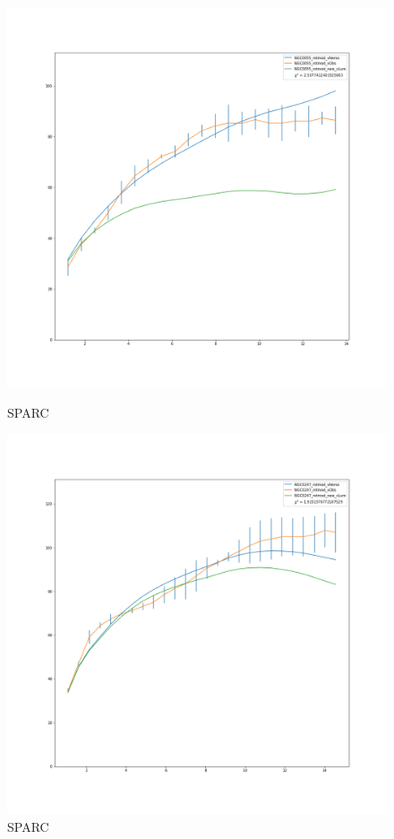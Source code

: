 \documentclass[reprint,%
 amsmath,amssymb,
 aps,
]{revtex4-1}
\begin{document}
\begin{figure} 
\centering
\begin{minipage}{0.5\textwidth}
  \includegraphics[width=.8\linewidth]{figures/NGC0055_rotmod_XueSofue.png}
\caption{ SPARC\cite{2016Lelli}}
\label{fig:2841}
\end{minipage}
\begin{minipage}{0.5\textwidth}
  \includegraphics[width=.8\linewidth]{figures/NGC0247_rotmod_XueSofue.png}
\caption{ SPARC\cite{2016Lelli}}
\label{fig:2915}
\end{minipage}
\end{figure}
\end{document}
